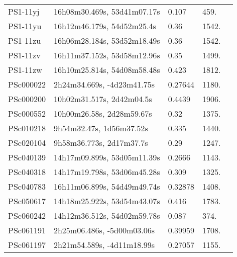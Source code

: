 \begin{longtable}{lllll}
         PS1-11yj &    16h08m30.469s, 53d41m07.17s &    0.107 &           459. &    \citet{2014ApJ...795...44R} \\
         PS1-11yu &     16h12m46.179s, 54d52m25.4s &     0.36 &          1542. &    \citet{2014ApJ...795...44R} \\
         PS1-11zu &    16h06m28.184s, 53d52m18.49s &     0.36 &          1542. &    \citet{2014ApJ...795...44R} \\
         PS1-11zv &    16h11m37.152s, 53d58m12.96s &     0.35 &          1499. &    \citet{2014ApJ...795...44R} \\
         PS1-11zw &    16h10m25.814s, 54d08m58.48s &    0.423 &          1812. &    \citet{2014ApJ...795...44R} \\
        PSc000022 &     2h24m34.669s, -4d23m41.75s &  0.27644 &          1180. &    \citet{2008MNRAS.386..697R} \\
        PSc000200 &      10h02m31.517s, 2d42m04.5s &   0.4439 &          1906. &    \citet{2008ApJS..176...19F} \\
        PSc000552 &      10h00m26.58s, 2d28m59.67s &     0.32 &          1375. &    \citet{2007ApJS..172...99C} \\
        PSc010218 &       9h54m32.47s, 1d56m37.52s &    0.335 &          1440. &    \citet{2009ApJS..180...67R} \\
        PSc020104 &       9h58m36.773s, 2d17m37.7s &     0.29 &          1247. &    \citet{2007ApJS..172...99C} \\
        PSc040139 &    14h17m09.899s, 53d05m11.39s &   0.2666 &          1143. &    \citet{2009ApJ...703L.162F} \\
        PSc040318 &    14h17m19.798s, 53d06m45.28s &    0.309 &          1325. &    \citet{2005ApJS..158..161H} \\
        PSc040783 &    16h11m06.899s, 54d49m49.74s &  0.32878 &          1408. &    \citet{2016SDSSD.C...0000:} \\
        PSc050617 &    14h18m25.922s, 53d54m43.07s &    0.416 &          1783. &    \citet{2005ApJS..158..161H} \\
        PSc060242 &    14h12m36.512s, 54d02m59.78s &    0.087 &           374. &    \citet{2005ApJS..158..161H} \\
        PSc061191 &     2h25m06.486s, -5d00m03.06s &  0.39959 &          1708. &    \citet{2008MNRAS.386..697R} \\
        PSc061197 &     2h21m54.589s, -4d11m18.99s &  0.27057 &          1155. &    \citet{2008MNRAS.386..697R} \\

\end{longtable}
